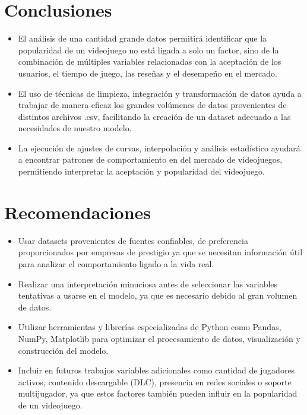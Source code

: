 \documentclass[12pt]{report}
\begin{document}
\section*{Conclusiones}
\begin{itemize}
    \item El análisis de una cantidad grande datos permitirá identificar que la popularidad de un videojuego no está ligada a solo un factor, sino de la combinación de múltiples variables relacionadas con la aceptación de los usuarios, el tiempo de juego, las reseñas y el desempeño en el mercado.
    \item El uso de técnicas de limpieza, integración y transformación de datos ayuda a trabajar de manera eficaz los grandes volúmenes de datos provenientes de distintos archivos .csv, facilitando la creación de un dataset adecuado a las necesidades de nuestro modelo.
    \item La ejecución de ajustes de curvas, interpolación y análisis estadístico ayudará a encontrar patrones de comportamiento en del mercado de videojuegos, permitiendo interpretar la aceptación y popularidad del videojuego.
\end{itemize}

\section*{Recomendaciones}
\begin{itemize}
    \item Usar datasets provenientes de fuentes confiables, de preferencia proporcionados por empresas de prestigio ya que se necesitan información útil para analizar el comportamiento ligado a la vida real.
    \item Realizar una interpretación minuciosa antes de seleccionar las variables tentativas a usarse en el modelo, ya que es necesario debido al gran volumen de datos.
    \item Utilizar herramientas y librerías especializadas de Python como Pandas, NumPy, Matplotlib para optimizar el procesamiento de datos, visualización y construcción del modelo.
    \item Incluir en futuros trabajos variables adicionales como cantidad de jugadores activos, contenido descargable (DLC), presencia en redes sociales o soporte multijugador, ya que estos factores también pueden influir en la popularidad de un videojuego.
\end{itemize}

\vspace{0.5cm}

\renewcommand{\bibname}{\MakeUppercase{REFERENCIAS}}


\end{document}
